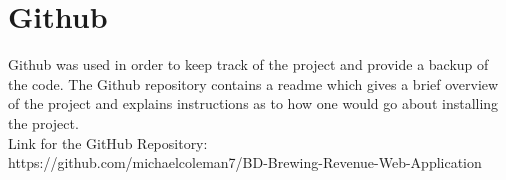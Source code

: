 \section{Github}
Github was used in order to keep track of the project and provide a backup of the code. The Github repository contains a readme which gives a brief overview of the project and explains instructions as to how one would go about installing the project. \\
Link for the GitHub Repository: \\
https://github.com/michaelcoleman7/BD-Brewing-Revenue-Web-Application